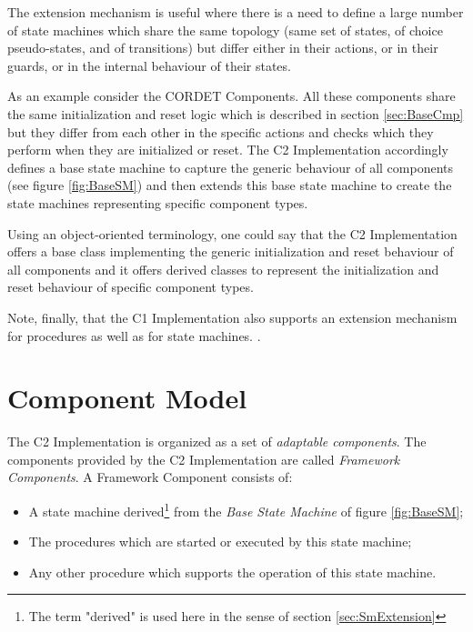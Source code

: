 \documentclass{pnp_article}
\begin{document}
The extension mechanism is useful where there is a need to define a large number of state machines which share the same topology (same set of states, of choice pseudo-states, and of transitions) but differ either in their actions, or in their guards, or in the internal behaviour of their states.

As an example consider the CORDET Components. All these components share the same initialization and reset logic which is described in section \ref{sec:BaseCmp} but they differ from each other in the specific actions and checks which they perform when they are initialized or reset. The C2 Implementation accordingly defines a base state machine to capture the generic behaviour of all components (see figure \ref{fig:BaseSM}) and then extends this base state machine to create the state machines representing specific component types. 

Using an object-oriented terminology, one could say that the C2 Implementation offers a base class implementing the generic initialization and reset behaviour of all components and it offers derived classes to represent the initialization and reset behaviour of specific component types.

Note, finally, that the C1 Implementation also supports an extension mechanism for procedures as well as for state machines. . 

\section{Component Model}\label{sec:CmpModel}\label{sec:BaseCmp}
The C2 Implementation is organized as a set of \textit{adaptable components}. The components provided by the C2 Implementation are called \textit{Framework Components}. A Framework Component consists of:

\begin{itemize}
\item A state machine derived\footnote{The term "derived" is used here in the sense of section \ref{sec:SmExtension}} from the \textit{Base State Machine} of figure \ref{fig:BaseSM};
\item The procedures which are started or executed by this state machine;
\item Any other procedure which supports the operation of this state machine.
\end{itemize}
\end{document}
